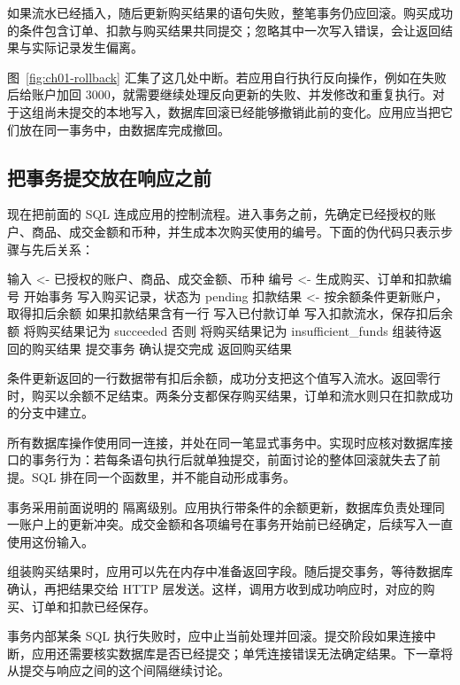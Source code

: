 如果流水已经插入，随后更新购买结果的语句失败，整笔事务仍应回滚。购买成功的条件包含订单、扣款与购买结果共同提交；忽略其中一次写入错误，会让返回结果与实际记录发生偏离。

图~\ref{fig:ch01-rollback} 汇集了这几处中断。若应用自行执行反向操作，例如在失败后给账户加回 3000，就需要继续处理反向更新的失败、并发修改和重复执行。对于这组尚未提交的本地写入，数据库回滚已经能够撤销此前的变化。应用应当把它们放在同一事务中，由数据库完成撤回。



\subsection*{把事务提交放在响应之前}

现在把前面的 SQL 连成应用的控制流程。进入事务之前，先确定已经授权的账户、商品、成交金额和币种，并生成本次购买使用的编号。下面的伪代码只表示步骤与先后关系：

\begin{BookCode}
输入 <- 已授权的账户、商品、成交金额、币种
编号 <- 生成购买、订单和扣款编号
开始事务
    写入购买记录，状态为 pending
    扣款结果 <- 按余额条件更新账户，取得扣后余额
    如果扣款结果含有一行
        写入已付款订单
        写入扣款流水，保存扣后余额
        将购买结果记为 succeeded
    否则
        将购买结果记为 insufficient_funds
    组装待返回的购买结果
提交事务
确认提交完成
返回购买结果
\end{BookCode}

条件更新返回的一行数据带有扣后余额，成功分支把这个值写入流水。返回零行时，购买以余额不足结束。两条分支都保存购买结果，订单和流水则只在扣款成功的分支中建立。

所有数据库操作使用同一连接，并处在同一笔显式事务中。实现时应核对数据库接口的事务行为：若每条语句执行后就单独提交，前面讨论的整体回滚就失去了前提。SQL 排在同一个函数里，并不能自动形成事务。

事务采用前面说明的  隔离级别。应用执行带条件的余额更新，数据库负责处理同一账户上的更新冲突。成交金额和各项编号在事务开始前已经确定，后续写入一直使用这份输入。

组装购买结果时，应用可以先在内存中准备返回字段。随后提交事务，等待数据库确认，再把结果交给 HTTP 层发送。这样，调用方收到成功响应时，对应的购买、订单和扣款已经保存。

事务内部某条 SQL 执行失败时，应中止当前处理并回滚。提交阶段如果连接中断，应用还需要核实数据库是否已经提交；单凭连接错误无法确定结果。下一章将从提交与响应之间的这个间隔继续讨论。

